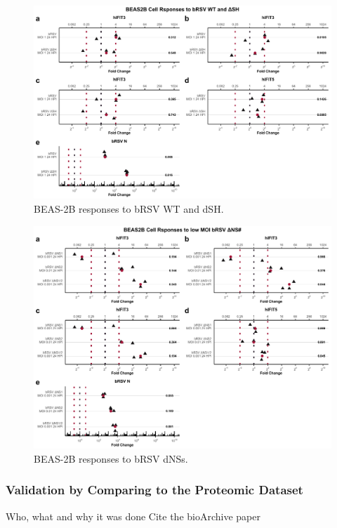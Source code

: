 \begin{figure}
    \centering
    \includegraphics[width=1\linewidth]{06. Chapter 1/Figs/01. Induction/11. beas2b_brsv_moi1.pdf}
    \caption[BEAS-2B responses to bRSV WT and dSH.]{BEAS-2B responses to bRSV WT and dSH.}
    \label{BEAS-2B responses to bRSV WT and dSH.}
\end{figure}

\begin{figure}
    \centering
    \includegraphics[width=1\linewidth]{06. Chapter 1/Figs/01. Induction/12. beas2b_brsv_dns.pdf}
    \caption[BEAS-2B responses to bRSV dNSs.]{BEAS-2B responses to bRSV dNSs.}
    \label{BEAS-2B responses to bRSV dNSs.}
\end{figure}



\subsubsection{Validation by Comparing to the Proteomic Dataset} \label{Validation by Comparing to the Proteomic Dataset}
Who, what and why it was done  \newline
Cite the bioArchive paper \cite{Jobe2023ViralCondensates}

